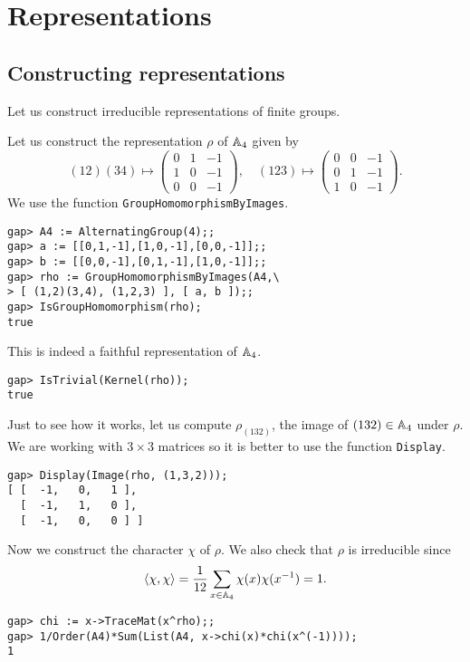 \chapter{Representations}

\section{Constructing representations}

Let us construct irreducible representations of finite groups. 

\begin{example}
Let us construct the representation $\rho$ of $\mathbb{A}_4$ given by 
\begin{equation*}
  (12)(34)\mapsto\begin{pmatrix}
    0 & 1 & -1\\
    1 & 0 & -1\\
    0 & 0 & -1
  \end{pmatrix},
  \quad
  (123)\mapsto\begin{pmatrix}
    0 & 0 & -1\\
    0 & 1 & -1\\
    1 & 0 & -1
  \end{pmatrix}.
\end{equation*}
We use the function \lstinline{GroupHomomorphismByImages}. 
\begin{lstlisting}
gap> A4 := AlternatingGroup(4);;
gap> a := [[0,1,-1],[1,0,-1],[0,0,-1]];;
gap> b := [[0,0,-1],[0,1,-1],[1,0,-1]];;
gap> rho := GroupHomomorphismByImages(A4,\
> [ (1,2)(3,4), (1,2,3) ], [ a, b ]);;
gap> IsGroupHomomorphism(rho);
true
\end{lstlisting}
This is indeed a faithful representation of $\mathbb{A}_4$.
\begin{lstlisting}
gap> IsTrivial(Kernel(rho));
true
\end{lstlisting}
Just to see how it works, let us compute $\rho_{(132)}$, the image of
$(132)\in\mathbb{A}_4$ under $\rho$. We are working with $3\times 3$ matrices so it
is better to use the function
\lstinline{Display}.
\begin{lstlisting}
gap> Display(Image(rho, (1,3,2)));                                              
[ [  -1,   0,   1 ],
  [  -1,   1,   0 ],
  [  -1,   0,   0 ] ]
\end{lstlisting}
Now we construct the character $\chi$ of $\rho$. We also check that $\rho$ is
irreducible since 
\[
\langle\chi,\chi\rangle=\frac{1}{12}\sum_{x\in\mathbb{A}_4}\chi(x)\chi(x^{-1})=1.
\]
\begin{lstlisting}
gap> chi := x->TraceMat(x^rho);;
gap> 1/Order(A4)*Sum(List(A4, x->chi(x)*chi(x^(-1))));
1
\end{lstlisting}
\end{example}

